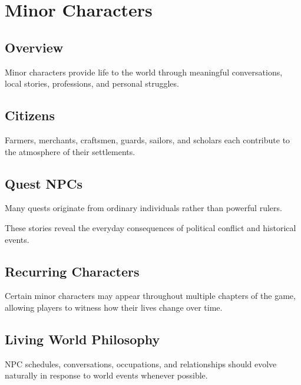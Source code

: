 \chapter{Minor Characters}

\section{Overview}

Minor characters provide life to the world through meaningful conversations, local stories, professions, and personal struggles.

\section{Citizens}

Farmers, merchants, craftsmen, guards, sailors, and scholars each contribute to the atmosphere of their settlements.

\section{Quest NPCs}

Many quests originate from ordinary individuals rather than powerful rulers.

These stories reveal the everyday consequences of political conflict and historical events.

\section{Recurring Characters}

Certain minor characters may appear throughout multiple chapters of the game, allowing players to witness how their lives change over time.

\section{Living World Philosophy}

NPC schedules, conversations, occupations, and relationships should evolve naturally in response to world events whenever possible.